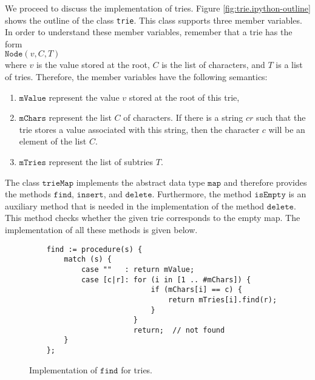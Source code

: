 \noindent
We proceed to discuss the implementation of tries.  Figure \ref{fig:trie.ipython-outline} shows the
outline of the class \texttt{trie}.  This class supports three member variables.  In order to
understand these member variables, remember that a trie has the form
\\[0.2cm]
\hspace*{1.3cm}
$\texttt{Node}(v, C, T)$
\\[0.2cm]
where $v$ is the value stored at the root, $C$ is the list of characters, and $T$ is a list of
tries.  Therefore, the member variables have the following semantics:
\begin{enumerate}
\item $\texttt{mValue}$ represent the value $v$ stored at the root of this trie,  
\item $\texttt{mChars}$ represent the list  $C$ of characters.  If there is a string $cr$ such that
      the trie stores a value associated with this string, then the character $c$ will be an element of
      the list $C$.
\item $\texttt{mTries}$ represent the list of subtries $T$.  
\end{enumerate}
The class $\texttt{trieMap}$ implements the abstract data type $\texttt{map}$ and therefore provides the
methods $\texttt{find}$, $\texttt{insert}$, and $\texttt{delete}$.  Furthermore, the method
$\texttt{isEmpty}$ is an auxiliary method that is needed in the implementation of the method 
$\texttt{delete}$.  This method checks whether the given trie corresponds to the empty map.  The
implementation of all these methods is given below. 

\begin{figure}[!ht]
\centering
\begin{verbatim}
    find := procedure(s) {
        match (s) {
            case ""   : return mValue;
            case [c|r]: for (i in [1 .. #mChars]) {
                            if (mChars[i] == c) {
                                return mTries[i].find(r);
                            }
                        }
                        return;  // not found
        }
    };
\end{verbatim}
\vspace*{-0.3cm}
\caption{Implementation of $\texttt{find}$ for tries.}
\label{fig:trie.ipython-find}
\end{figure}


